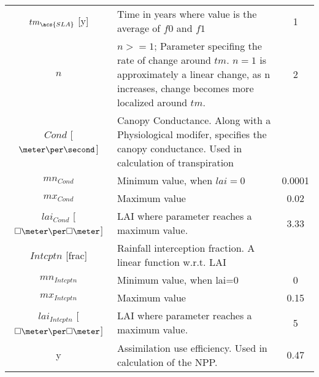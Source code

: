 \begin{tabularx}{\linewidth}{|c|X|c|}
   $tm_{\acs{SLA}}$ [y] & Time in years where value is the average of $f0$ and $f1$ & 1\\
   $n$  & $n>=1$; Parameter specifing the rate of change around $tm$.  $n=1$ is approximately a linear change, as n increases, change becomes more localized around $tm$. & 2\\
   \hline
   $Cond$ [$\meter\per\second$] &  Canopy Conductance.  Along with a Physiological modifer, specifies the canopy conductance.  Used in calculation of transpiration & \\
   $mn_{Cond}$ & Minimum value, when $lai=0$ & 0.0001\\
   $mx_{Cond}$ & Maximum value & 0.02\\
   $lai_{Cond}$ [$\square\meter\per\square\meter$] & \ac{LAI} where parameter reaches a maximum value. & 3.33\\
 \hline
 $Intcptn$ [frac] & Rainfall interception fraction.  A linear function w.r.t. \ac{LAI} & \\
  $mn_{Intcptn}$ & Minimum value, when lai=0 & 0\\
  $mx_{Intcptn}$ & Maximum value & 0.15\\
  $lai_{Intcptn}$ [$\square\meter\per\square\meter$] & \ac{LAI} where parameter reaches a maximum value. & 5\\
 \hline \hline
 y & Assimilation use efficiency.  Used in calculation of the NPP. & 0.47\\
 \hline 
\end{tabularx}

